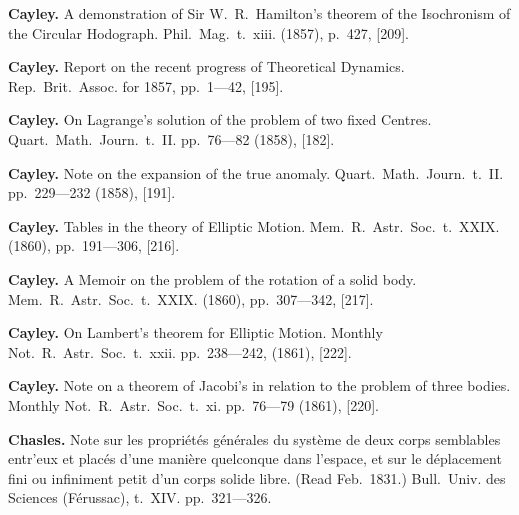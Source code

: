 \documentclass[12pt,a4paper]{article}
\theoremstyle{definition}
\begin{document}
\vspace{0.5em}

\noindent\textbf{Cayley.} A demonstration of Sir W.~R.~Hamilton's theorem of the Isochronism of the Circular Hodograph. Phil.~Mag.~t.~xiii. (1857), p.~427, [209].

\vspace{0.5em}

\noindent\textbf{Cayley.} Report on the recent progress of Theoretical Dynamics. Rep.~Brit.~Assoc. for 1857, pp.~1---42, [195].

\vspace{0.5em}

\noindent\textbf{Cayley.} On Lagrange's solution of the problem of two fixed Centres. Quart.~Math.~Journ.~t.~II. pp.~76---82 (1858), [182].

\vspace{0.5em}

\noindent\textbf{Cayley.} Note on the expansion of the true anomaly. Quart.~Math.~Journ.~t.~II. pp.~229---232 (1858), [191].

\vspace{0.5em}

\noindent\textbf{Cayley.} Tables in the theory of Elliptic Motion. Mem.~R.~Astr.~Soc.~t.~XXIX. (1860), pp.~191---306, [216].

\vspace{0.5em}

\noindent\textbf{Cayley.} A Memoir on the problem of the rotation of a solid body. Mem.~R.~Astr.~Soc.~t.~XXIX. (1860), pp.~307---342, [217].

\vspace{0.5em}

\noindent\textbf{Cayley.} On Lambert's theorem for Elliptic Motion. Monthly Not.~R.~Astr.~Soc.~t.~xxii. pp.~238---242, (1861), [222].

\vspace{0.5em}

\noindent\textbf{Cayley.} Note on a theorem of Jacobi's in relation to the problem of three bodies. Monthly Not.~R.~Astr.~Soc.~t.~xi. pp.~76---79 (1861), [220].

\vspace{0.5em}

\noindent\textbf{Chasles.} Note sur les propri\'{e}t\'{e}s g\'{e}n\'{e}rales du syst\`{e}me de deux corps semblables entr'eux et plac\'{e}s d'une mani\`{e}re quelconque dans l'espace, et sur le d\'{e}placement fini ou infiniment petit d'un corps solide libre. (Read Feb.~1831.) Bull.~Univ. des Sciences (F\'{e}russac), t.~XIV. pp.~321---326.
\end{document}
